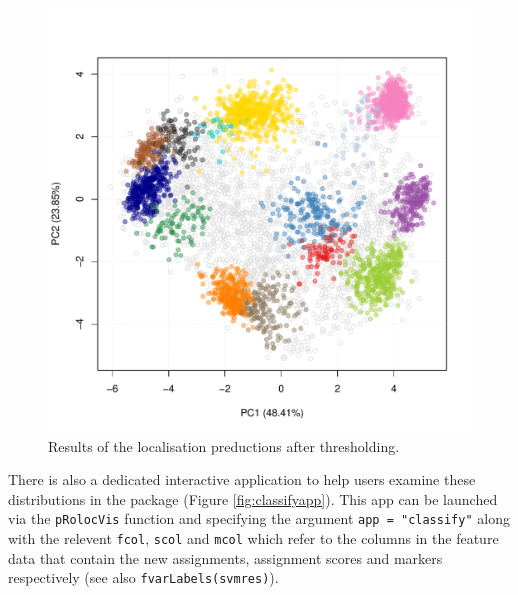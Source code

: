 \begin{figure}[!ht]
    \centering
\begin{knitrout}
\color{fgcolor}\begin{kframe}
\begin{alltt}
  \hlstd{=} \hlstd{)}
\end{alltt}
\end{kframe}
\includegraphics[width=.7\textwidth]{figure/plotres-1} 

\end{knitrout}
  \caption{Results of the localisation preductions after thresholding.}
  \label{fig:plotres}
\end{figure}


There is also a dedicated interactive application to help users
examine these distributions in the  package (Figure
\ref{fig:classifyapp}).  This app can be launched via the
\texttt{pRolocVis} function and specifying the argument \texttt{app =
  "classify"} along with the relevent \texttt{fcol}, \texttt{scol} and
\texttt{mcol} which refer to the columns in the feature data that
contain the new assignments, assignment scores and markers
respectively (see also \texttt{fvarLabels(svmres)}).

\begin{knitrout}
\color{fgcolor}\begin{kframe}
\begin{alltt}
\hlstd{(}\hlstd{)}
  \hlstd{=} \hlstd{,}  \hlstd{=} \hlstd{,}  \hlstd{=} \hlstd{,}  \hlstd{=} \hlstd{)}
\end{alltt}
\end{kframe}
\end{knitrout}

